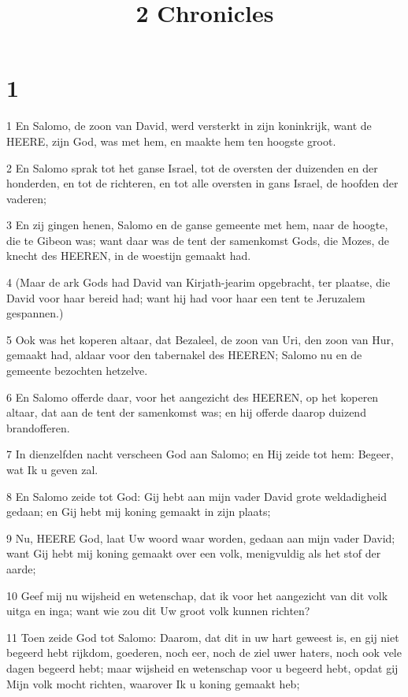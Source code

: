 

\title{2 Chronicles}



\chapter{1}

\par 1 En Salomo, de zoon van David, werd versterkt in zijn koninkrijk, want de HEERE, zijn God, was met hem, en maakte hem ten hoogste groot.
\par 2 En Salomo sprak tot het ganse Israel, tot de oversten der duizenden en der honderden, en tot de richteren, en tot alle oversten in gans Israel, de hoofden der vaderen;
\par 3 En zij gingen henen, Salomo en de ganse gemeente met hem, naar de hoogte, die te Gibeon was; want daar was de tent der samenkomst Gods, die Mozes, de knecht des HEEREN, in de woestijn gemaakt had.
\par 4 (Maar de ark Gods had David van Kirjath-jearim opgebracht, ter plaatse, die David voor haar bereid had; want hij had voor haar een tent te Jeruzalem gespannen.)
\par 5 Ook was het koperen altaar, dat Bezaleel, de zoon van Uri, den zoon van Hur, gemaakt had, aldaar voor den tabernakel des HEEREN; Salomo nu en de gemeente bezochten hetzelve.
\par 6 En Salomo offerde daar, voor het aangezicht des HEEREN, op het koperen altaar, dat aan de tent der samenkomst was; en hij offerde daarop duizend brandofferen.
\par 7 In dienzelfden nacht verscheen God aan Salomo; en Hij zeide tot hem: Begeer, wat Ik u geven zal.
\par 8 En Salomo zeide tot God: Gij hebt aan mijn vader David grote weldadigheid gedaan; en Gij hebt mij koning gemaakt in zijn plaats;
\par 9 Nu, HEERE God, laat Uw woord waar worden, gedaan aan mijn vader David; want Gij hebt mij koning gemaakt over een volk, menigvuldig als het stof der aarde;
\par 10 Geef mij nu wijsheid en wetenschap, dat ik voor het aangezicht van dit volk uitga en inga; want wie zou dit Uw groot volk kunnen richten?
\par 11 Toen zeide God tot Salomo: Daarom, dat dit in uw hart geweest is, en gij niet begeerd hebt rijkdom, goederen, noch eer, noch de ziel uwer haters, noch ook vele dagen begeerd hebt; maar wijsheid en wetenschap voor u begeerd hebt, opdat gij Mijn volk mocht richten, waarover Ik u koning gemaakt heb;
